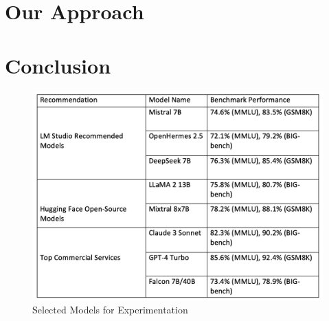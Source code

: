 \documentclass[conference]{IEEEtran}
\begin{document}
\section{Our Approach}








\section{Conclusion}
 
\begin{figure}[ht]
    \centering
    \includegraphics[width=\linewidth]{Fig/Selected_LLM.png}
    \caption{Selected Models for Experimentation}
    \label{fig:enter-label}
\end{figure}
\end{document}
